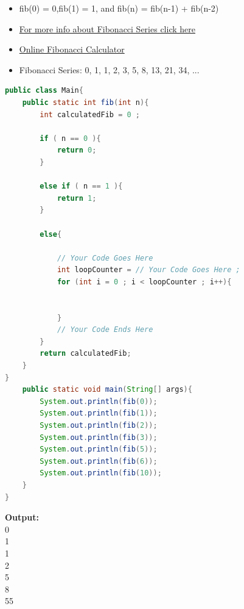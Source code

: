 \documentclass[12pt , a4paper]{article}
\begin{document}
	\begin{importantBox}

		\begin{itemize}
			\item  fib(0) = 0,fib(1) = 1, and fib(n) = fib(n-1) + fib(n-2) \\
			\item  \href{https://en.wikipedia.org/wiki/Fibonacci_number}{For more info about Fibonacci Series click here}\\
			\item \href{https://www.omnicalculator.com/math/fibonacci}{Online Fibonacci Calculator}\\
			\item Fibonacci Series: 0, 1, 1, 2, 3, 5, 8, 13, 21, 34, ...
		\end{itemize}
	\end{importantBox}
	\begin{lstlisting}[language=Java]
public class Main{
	public static int fib(int n){
		int calculatedFib = 0 ;

		if ( n == 0 ){
			return 0;
		}
		
		else if ( n == 1 ){
			return 1;
		}

		else{

			// Your Code Goes Here
			int loopCounter = // Your Code Goes Here ;
			for (int i = 0 ; i < loopCounter ; i++){
	
			
			}
			// Your Code Ends Here	
		}
		return calculatedFib;
	}
}
	public static void main(String[] args){
		System.out.println(fib(0));	
		System.out.println(fib(1));
		System.out.println(fib(2));
		System.out.println(fib(3));	
		System.out.println(fib(5));	
		System.out.println(fib(6));	
		System.out.println(fib(10));		
	}
}
	\end{lstlisting}


	\begin{tcolorbox}
	\textbf{Output:}\\
	0\\
	1\\
	1\\
	2\\
	5\\
	8 \\
	55\\
	\end{tcolorbox}
\end{document}
